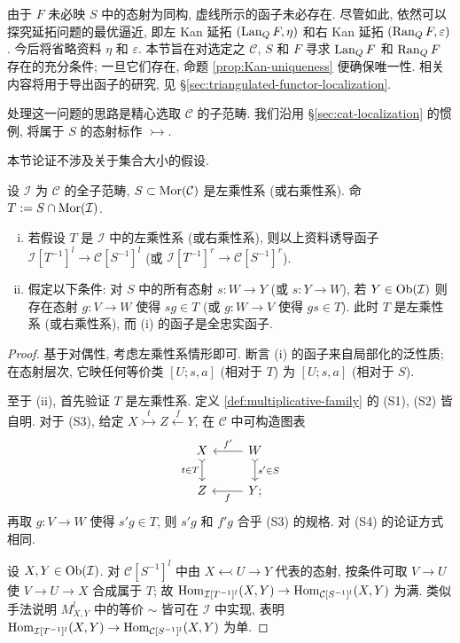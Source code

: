 由于 $F$ 未必映 $S$ 中的态射为同构, 虚线所示的函子未必存在. 尽管如此, 依然可以探究延拓问题的最优逼近, 即左 Kan 延拓 $(\operatorname{Lan}_Q F, \eta)$ 和右 Kan 延拓 $(\operatorname{Ran}_Q F, \varepsilon)$. 今后将省略资料 $\eta$ 和 $\varepsilon$. 本节旨在对选定之 $\mathcal{C}$, $S$ 和 $F$ 寻求 $\operatorname{Lan}_Q F$ 和 $\operatorname{Ran}_Q F$ 存在的充分条件; 一旦它们存在, 命题 \ref{prop:Kan-uniqueness} 便确保唯一性. 相关内容将用于导出函子的研究, 见 \S\ref{sec:triangulated-functor-localization}.

处理这一问题的思路是精心选取 $\mathcal{C}$ 的子范畴. 我们沿用 \S\ref{sec:cat-localization} 的惯例, 将属于 $S$ 的态射标作 $\rightarrowtail$.

本节论证不涉及关于集合大小的假设.

\begin{proposition}\label{prop:subcat-localization}
	设 $\mathcal{I}$ 为 $\mathcal{C}$ 的全子范畴, $S \subset \operatorname{Mor}(\mathcal{C})$ 是左乘性系 (或右乘性系). 命 $T := S \cap \operatorname{Mor}(\mathcal{I})$.
	\begin{enumerate}[(i)]
		\item 若假设 $T$ 是 $\mathcal{I}$ 中的左乘性系 (或右乘性系), 则以上资料诱导函子 $\mathcal{I}[T^{-1}]^l \to \mathcal{C}[S^{-1}]^l$ (或 $\mathcal{I}[T^{-1}]^r \to \mathcal{C}[S^{-1}]^r$).
		\item 假定以下条件: 对 $S$ 中的所有态射 $s: W \to Y$ (或 $s: Y \to W$), 若 $Y \in \operatorname{Ob}(\mathcal{I})$ 则存在态射 $g: V \to W$ 使得 $sg \in T$ (或 $g: W \to V$ 使得 $gs \in T$). 此时 $T$ 是左乘性系 (或右乘性系), 而 (i) 的函子是全忠实函子.
	\end{enumerate}
\end{proposition}
\begin{proof}
	基于对偶性, 考虑左乘性系情形即可. 断言 (i) 的函子来自局部化的泛性质; 在态射层次, 它映任何等价类 $[U; s, a]$ (相对于 $T$) 为 $[U; s, a]$ (相对于 $S$).
	
	至于 (ii), 首先验证 $T$ 是左乘性系. 定义 \ref{def:multiplicative-family} 的 (S1), (S2) 皆自明. 对于 (S3), 给定 $X \stackrel{t}{\rightarrowtail} Z \stackrel{f}{\leftarrow} Y$, 在 $\mathcal{C}$ 中可构造图表
	\[\begin{tikzcd}
		X \arrow[rightarrowtail, d, "{t \in T}"'] & W \arrow[l, "{f'}"'] \arrow[rightarrowtail, d, "{s' \in S}"] \\
		Z & Y \arrow[l, "f"] ;
	\end{tikzcd}\]
	再取 $g: V \to W$ 使得 $s' g \in T$, 则 $s'g$ 和 $f'g$ 合乎 (S3) 的规格. 对 (S4) 的论证方式相同.

	设 $X, Y \in \operatorname{Ob}(\mathcal{I})$. 对 $\mathcal{C}[S^{-1}]^l$ 中由 $X \leftarrowtail U \to Y$ 代表的态射, 按条件可取 $V \to U$ 使 $V \to U \to X$ 合成属于 $T$; 故 $\operatorname{Hom}_{\mathcal{I}[T^{-1}]^l}(X, Y) \to \operatorname{Hom}_{\mathcal{C}[S^{-1}]^l}(X, Y)$ 为满. 类似手法说明 $M_{X, Y}^l$ 中的等价 $\sim$ 皆可在 $\mathcal{I}$ 中实现, 表明 $\operatorname{Hom}_{\mathcal{I}[T^{-1}]^l}(X, Y) \to \operatorname{Hom}_{\mathcal{C}[S^{-1}]^l}(X, Y)$ 为单.
\end{proof}

